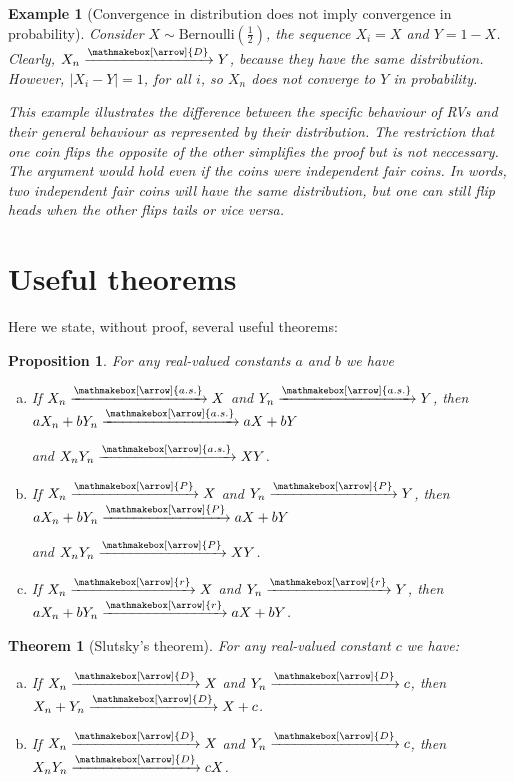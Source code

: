 \documentclass{book}
\theoremstyle{plain}%
\newtheorem{prototheorem}{Example}[section]
\newenvironment{cexample}
   {\colorlet{shadecolor}{gray!10}\begin{shaded}\begin{prototheorem}}
   {\end{prototheorem}\end{shaded}}
\newtheorem{theorem}{Theorem}[section]
\newtheorem{proposition}{Proposition}[section]
\theoremstyle{definition}
\newlength{\arrow}
\newcommand*{\myrightarrow}[1]{\xrightarrow{\mathmakebox[\arrow]{#1}}}
\begin{document}
\begin{cexample}[Convergence in distribution does not imply convergence in probability]
Consider $X \sim \text{Bernoulli}(\frac{1}{2})$, the sequence $X_i = X$ and $Y = 1 - X$. Clearly, $X_n \myrightarrow{D} Y$, because they have the same distribution. However, $|X_i - Y| = 1$, for all $i$, so $X_n$ does not converge to $Y$ in probability. 

This example illustrates the difference between the specific behaviour of RVs and their general behaviour as represented by their distribution. The restriction that one coin flips the opposite of the other simplifies the proof but is not neccessary. The argument would hold even if the coins were independent fair coins. In words, two independent fair coins will have the same distribution, but one can still flip heads when the other flips tails or vice versa.\label{ex:cid_cip}
\end{cexample}

\section{Useful theorems}

Here we state, without proof, several useful theorems:

\begin{proposition}

For any real-valued constants $a$ and $b$ we have

\begin{enumerate}[(a)]
\item If $X_n \myrightarrow{a.s.} X$ and $Y_n \myrightarrow{a.s.} Y$, then $aX_n + bY_n \myrightarrow{a.s.} aX + bY$ 

and $X_nY_n \myrightarrow{a.s.} XY$.
\item If $X_n \myrightarrow{P} X$ and $Y_n \myrightarrow{P} Y$, then $aX_n + bY_n \myrightarrow{P} aX + bY$

and $X_nY_n \myrightarrow{P} XY$.
\item If $X_n \myrightarrow{r} X$ and $Y_n \myrightarrow{r} Y$, then $aX_n + bY_n \myrightarrow{r} aX + bY$.
\end{enumerate}
\end{proposition}

\begin{theorem}[Slutsky's theorem] For any real-valued constant $c$ we have:

\begin{enumerate}[(a)]
\item If $X_n \myrightarrow{D} X$ and $Y_n \myrightarrow{D} c$, then $X_n + Y_n \myrightarrow{D} X + c$.
\item If $X_n \myrightarrow{D} X$ and $Y_n \myrightarrow{D} c$, then $X_nY_n \myrightarrow{D} cX$.
\end{enumerate}
\end{theorem}
\end{document}
